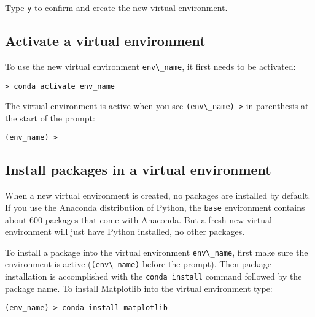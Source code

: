 \documentclass{book}
\newcommand{\passthrough}[1]{#1}
\begin{document}
Type \passthrough{\lstinline!y!} to confirm and create the new virtual
environment.
    




    
        \hypertarget{activate-a-virtual-environment}{%
\subsection{Activate a virtual
environment}\label{activate-a-virtual-environment}}

To use the new virtual environment \passthrough{\lstinline!env\_name!},
it first needs to be activated:

\begin{lstlisting}
> conda activate env_name
\end{lstlisting}

The virtual environment is active when you see
\passthrough{\lstinline!(env\_name) >!} in parenthesis at the start of
the prompt:

\begin{lstlisting}
(env_name) > 
\end{lstlisting}
    




    
        \hypertarget{install-packages-in-a-virtual-environment}{%
\subsection{Install packages in a virtual
environment}\label{install-packages-in-a-virtual-environment}}

When a new virtual environment is created, no packages are installed by
default. If you use the Anaconda distribution of Python, the
\passthrough{\lstinline!base!} environment contains about 600 packages
that come with Anaconda. But a fresh new virtual environment will just
have Python installed, no other packages.

To install a package into the virtual environment
\passthrough{\lstinline!env\_name!}, first make sure the environment is
active (\passthrough{\lstinline!(env\_name)!} before the prompt). Then
package installation is accomplished with the
\passthrough{\lstinline!conda install!} command followed by the package
name. To install Matplotlib into the virtual environment type:

\begin{lstlisting}
(env_name) > conda install matplotlib
\end{lstlisting}
\end{document}
